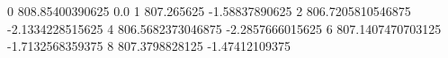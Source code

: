 0 808.85400390625 0.0
1 807.265625 -1.58837890625
2 806.7205810546875 -2.1334228515625
4 806.5682373046875 -2.2857666015625
6 807.1407470703125 -1.7132568359375
8 807.3798828125 -1.47412109375
